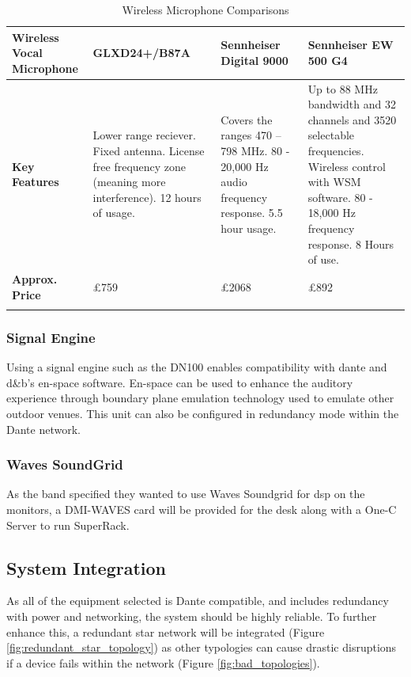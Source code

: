                 \begin{longtable}[c]{|p{1.5cm}|p{4.8cm}|p{4.8cm}|p{4.8cm}|}
                \hline
                \textbf{Wireless Vocal Microphone} &
                  \cellcolor[HTML]{FFCCC9}\textbf{GLXD24+/B87A} &
                  \cellcolor[HTML]{FFCCC9}\textbf{Sennheiser Digital 9000} &
                  \cellcolor[HTML]{9AFF99}\textbf{Sennheiser EW 500 G4} \\ \hline
                \endfirsthead
                \endhead
                \textbf{Key Features} &
                  \cellcolor[HTML]{FFCCC9}Lower range reciever. Fixed antenna. License free frequency zone (meaning more interference). 12 hours of usage. &
                  \cellcolor[HTML]{FFCCC9}Covers the ranges 470 – 798 MHz. 80 - 20,000 Hz audio frequency response. 5.5 hour usage. &
                  \cellcolor[HTML]{9AFF99}Up to 88 MHz bandwidth and 32 channels and 3520 selectable frequencies. Wireless control with WSM software. 80 - 18,000 Hz frequency response. 8 Hours of use. \\ \hline
                \textbf{Approx. Price} &
                  £759 &
                  £2068 &
                  £892 \\ \hline
                  \caption{Wireless Microphone Comparisons}
                    \label{tab:wireless_mic_comparisons}
                \end{longtable}

        \subsubsection{Signal Engine}
            Using a signal engine such as the DN100 enables compatibility with dante and d\&b's en-space software. En-space can be used to enhance the auditory experience through boundary plane emulation technology \citep{ds100} used to emulate other outdoor venues. This unit can also be configured in redundancy mode within the Dante network.

        \subsubsection{Waves SoundGrid}
            As the band specified they wanted to use Waves Soundgrid for \gls{dsp} on the monitors, a DMI-WAVES card will be provided for the desk along with a One-C Server to run SuperRack.
        
    \subsection{System Integration}
        As all of the equipment selected is Dante compatible, and includes redundancy with power and networking, the system should be highly reliable. To further enhance this, a redundant star network will be integrated (Figure \ref{fig:redundant_star_topology}) as other typologies can cause drastic disruptions if a device fails within the network (Figure \ref{fig:bad_topologies}).

